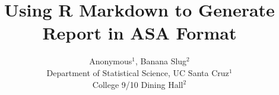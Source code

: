 


\usepackage{graphicx}


\usepackage{charter} %
\usepackage{enumerate} %
\usepackage{xy}  
\usepackage{setspace}
\usepackage{latexsym,amssymb,amsfonts,graphicx,color,fancyvrb,amsthm,enumerate,natbib,bm,booktabs,mathrsfs,float}
\usepackage{mathrsfs}
\usepackage[svgnames,dvipsnames,x11names]{xcolor}%
\usepackage{caption}
\usepackage{mathtools}
\usepackage{algorithm}
\usepackage{fancyhdr}
\usepackage{subfigure}

\usepackage{multicol}
\usepackage{setspace}               %
\usepackage{hyperref}
\usepackage{nameref}                %

\usepackage{epsfig}
\usepackage{amsmath}

\DeclareMathOperator*{\argmax}{arg\,max}
\DeclareMathOperator*{\argmin}{arg\,min}

\newcommand{\be}{\begin{equation}}
\newcommand{\ee}{\end{equation}}



\makeatletter
\newcommand{\labelText}[2]{%
#1\refstepcounter{mylabelcounter}%
\immediate\write\@auxout{%
  \string\newlabel{#2}{{1}{\thepage}{{\unexpanded{#1}}}{mylabelcounter.\number\value{mylabelcounter}}{}}%
}%
}
\makeatother



 \title{Using R Markdown to Generate Report in ASA Format}


\author{Anonymous$^1$, Banana Slug$^2$\\
Department of Statistical Science, UC Santa Cruz$^1$\\
College 9/10 Dining Hall$^2$}



